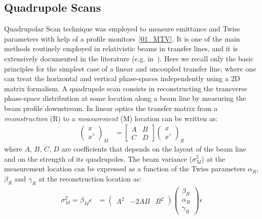 \subsection{Quadrupole Scans}
\label{03_2_QuadScans}

Quadrupolar Scan technique was employed to measure emittance and Twiss parameters with help of 
a profile monitors~\ref{01_MTV}.
It is one of the main methods routinely employed in 
relativistic beams in transfer lines, and it is extensively documented in the literature 
(e.g. in~\cite{Lohl2005}).
Here we recall only the basic principles for the simplest case of a
linear and uncoupled transfer line,
where one can treat the horizontal and vertical phase-spaces
independently using a 2D matrix formalism.
%
A quadrupole scan consists in reconstructing the transverse phase-space
distribution at some location along a beam line by measuring the beam
profile downstream.
In linear optics the transfer matrix from a \emph{reconstruction} (R)
to a \emph{measurement} (M) location can be written as:
%
\begin{align}
\begin{pmatrix}
x \\
x'
\end{pmatrix}_M
&=
\begin{bmatrix}
A & B \\
C & D
\end{bmatrix}
\begin{pmatrix}
x \\
x'
\end{pmatrix}_R
\label{eq:simpleTranport}
\end{align}
where $A$, $B$, $C$, $D$ are coefficients that depends on the layout of
the beam line and on the strength of its quadrupoles. 
%
The beam variance ($\sigma_M^2$) at the measurement location can be
expressed as a function of the Twiss parameters $\alpha_R$, $\beta_R$
and $\gamma_R$ at the reconstruction location as:
%
\begin{align}
 \sigma_M^2 = \beta_M \epsilon &= 
 \begin{pmatrix}
  A^2 & -2AB & B^2 
  \end{pmatrix} 
\begin{pmatrix}
   \beta_R \\
   \alpha_R \\
   \gamma_R
\end{pmatrix}
\epsilon
\label{eq:varianceForQuadscan}
\end{align}
